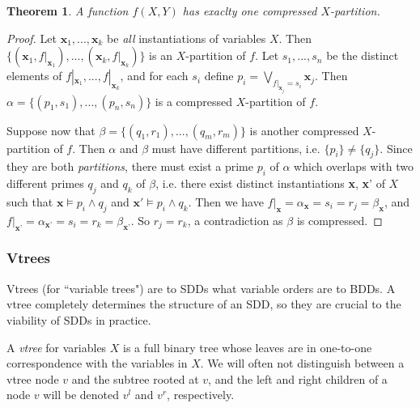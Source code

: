 \documentclass[11pt]{report}
\newtheorem{theorem}{Theorem}[section]
\newenvironment{definition}[1][Definition]{\begin{trivlist}
\item[\hskip \labelsep {\bfseries #1}]}{\end{trivlist}}
\begin{document}
\begin{theorem}
\label{unique_compressed}
A function $f(X, Y)$ has exaclty one compressed $X$-partition.
\end{theorem}
\begin{proof}
Let $\textbf{x}_1, ..., \textbf{x}_k$ be \textit{all} instantiations of variables $X$. Then $\{(\textbf{x}_1, f|_{\textbf{x}_1}), ..., (\textbf{x}_k, f|_{\textbf{x}_k})\}$ is an $X$-partition of $f$. Let $s_1, ..., s_n$ be the distinct elements of $f|_{\textbf{x}_1}, ..., f|_{\textbf{x}_k}$, and for each $s_i$ define $p_i = \bigvee_{f|_{\textbf{x}_j} = s_i} \textbf{x}_j$.
Then $\alpha = \{(p_1, s_1), ..., (p_n, s_n)\}$ is a compressed $X$-partition of $f$. 

Suppose now that $\beta = \{(q_1, r_1), ..., (q_m, r_m)\}$ is another compressed $X$-partition of $f$. Then $\alpha$ and $\beta$ must have different partitions, i.e. $\{p_i\} \neq \{q_j\}$. Since they are both \textit{partitions}, there must exist a prime $p_i$ of $\alpha$ which overlaps with two different primes $q_j$ and $q_k$ of $\beta$, i.e. there exist distinct instantiations \textbf{x}, \textbf{x}' of $X$ such that $\textbf{x} \models p_i \land q_j$ and $\textbf{x}' \models p_i \land q_k$. Then we have $f|_\textbf{x} = \alpha_\textbf{x} = s_i = r_j = \beta_\textbf{x}$, and $f|_\textbf{x'} = \alpha_\textbf{x'} = s_i = r_k = \beta_\textbf{x'}$. So $r_j = r_k$, a contradiction as $\beta$ is compressed.  
\end{proof}

\subsubsection{Vtrees}

Vtrees (for ``variable trees") are to SDDs what variable orders are to BDDs. A vtree completely determines the structure of an SDD, so they are crucial to the viability of SDDs in practice.

\begin{definition}
A \textit{vtree} for variables $X$ is a full binary tree whose leaves are in one-to-one correspondence with the  variables in $X$. We will often not distinguish between a vtree node $v$ and the subtree rooted at $v$, and the left and right children of a node $v$ will be denoted $v^l$ and $v^r$, respectively.
\end{definition}
\end{document}
